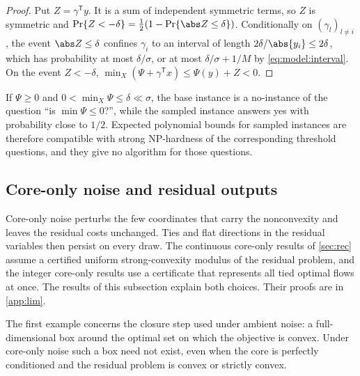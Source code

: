 \begin{proof}
Put $Z=\gamma^{\mathsf T}y$. It is a sum of independent symmetric terms, so
$Z$ is symmetric and $\Pr\{Z<-\delta\}=\frac12(1-\Pr\{\abs Z\le\delta\})$.
Conditionally on $(\gamma_l)_{l\ne i}$, the event $\abs Z\le\delta$ confines
$\gamma_i$ to an interval of length $2\delta/\abs{y_i}\le2\delta$, which has
probability at most $\delta/\sigma$, or at most $\delta/\sigma+1/M$ by
\eqref{eq:model:interval}. On the event $Z<-\delta$,
$\min_X(\Psi+\gamma^{\mathsf T}x)\le\Psi(y)+Z<0$.
\end{proof}

If $\Psi\ge0$ and $0<\min_X\Psi\le\delta\ll\sigma$, the base instance is a
no-instance of the question ``is $\min\Psi\le0$?'', while the sampled
instance answers yes with probability close to $1/2$. Expected polynomial
bounds for sampled instances are therefore compatible with strong
NP-hardness of the corresponding threshold questions, and they give no
algorithm for those questions.

\subsection{Core-only noise and residual outputs}\label{sec:lim:points}

Core-only noise perturbs the few coordinates that carry the nonconvexity
and leaves the residual costs unchanged. Ties and flat directions in the
residual variables then persist on every draw. The continuous core-only
results of \cref{sec:rec} assume a certified uniform strong-convexity
modulus of the residual problem, and the integer core-only results use a
certificate that represents all tied optimal flows at once. The results of
this subsection explain both choices. Their proofs are in \cref{app:lim}.

The first example concerns the closure step used under ambient noise: a
full-dimensional box around the optimal set on which the objective is
convex. Under core-only noise such a box need not exist, even when the core
is perfectly conditioned and the residual problem is convex or strictly
convex.

